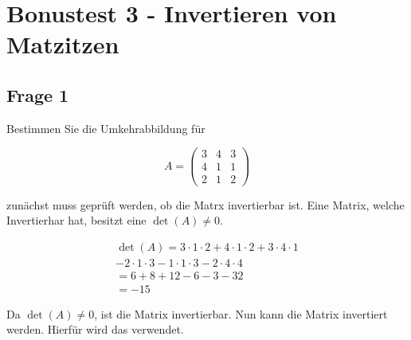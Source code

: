 \chapter{Bonustest 3 - Invertieren von Matzitzen}

\section{Frage 1}

Bestimmen Sie die Umkehrabbildung für

\[
    A = \begin{pmatrix}
        3 & 4 & 3 \\
        4 & 1 & 1 \\
        2 & 1 & 2
    \end{pmatrix}
\]

zunächst muss geprüft werden, ob die Matrx invertierbar ist. Eine Matrix,
welche Invertierhar hat, besitzt eine $\det(A) \neq 0$.

\begin{align*}
    \det(A) = 3 \cdot 1 \cdot 2 + 4 \cdot 1 \cdot 2 + 3 \cdot 4 \cdot 1 \\
    - 2 \cdot 1 \cdot 3 - 1 \cdot 1 \cdot 3 - 2 \cdot 4 \cdot 4         \\
    = 6 + 8 + 12 - 6 - 3 - 32                                           \\
    = -15
\end{align*}

Da $\det(A) \neq 0$, ist die Matrix invertierbar. Nun kann die Matrix
invertiert werden. Hierfür wird das  verwendet.

